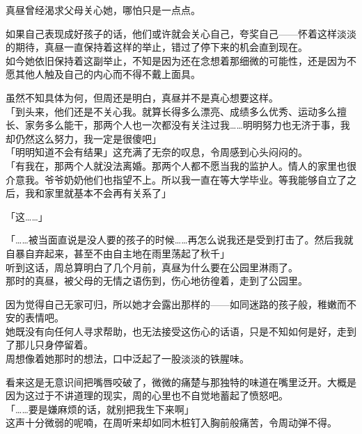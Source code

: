真昼曾经渴求父母关心她，哪怕只是一点点。

如果自己表现成好孩子的话，他们或许就会关心自己，夸奖自己——怀着这样淡淡的期待，真昼一直保持着这样的举止，错过了停下来的机会直到现在。\\

如今她依旧保持着这副举止，不知是因为还在念想着那细微的可能性，还是因为不愿其他人触及自己的内心而不得不戴上面具。

虽然不知具体为何，但周还是明白，真昼并不是真心想要这样。\\

「到头来，他们还是不关心我。就算长得多么漂亮、成绩多么优秀、运动多么擅长、家务多么能干，那两个人也一次都没有关注过我……明明努力也无济于事，我却仍然这么努力，我一定是很傻吧」\\

「明明知道不会有结果」这充满了无奈的叹息，令周感到心头闷闷的。\\

「有我在，那两个人就没法离婚。那两个人都不愿当我的监护人。情人的家里也很介意我。爷爷奶奶他们也指望不上。所以我一直在等大学毕业。等我能够自立了之后，我和家里就基本不会再有关系了」

「这……」

「……被当面直说是没人要的孩子的时候……再怎么说我还是受到打击了。然后我就自暴自弃起来，甚至不由自主地在雨里荡起了秋千」\\

听到这话，周总算明白了几个月前，真昼为什么要在公园里淋雨了。\\

那时的真昼，被父母的无情之语伤到，伤心地彷徨着，走到了公园里。

因为觉得自己无家可归，所以她才会露出那样的——如同迷路的孩子般，稚嫩而不安的表情吧。\\

她既没有向任何人寻求帮助，也无法接受这伤心的话语，只是不知如何是好，走到了那儿只身停留着。\\

周想像着她那时的想法，口中泛起了一股淡淡的铁腥味。

看来这是无意识间把嘴唇咬破了，微微的痛楚与那独特的味道在嘴里泛开。大概是因为这过于不讲道理的现实，周的心里也不自觉地蓄起了愤怒吧。\\

「……要是嫌麻烦的话，就别把我生下来啊」\\

这声十分微弱的呢喃，在周听来却如同木桩钉入胸前般痛苦，令周动弹不得。\\

